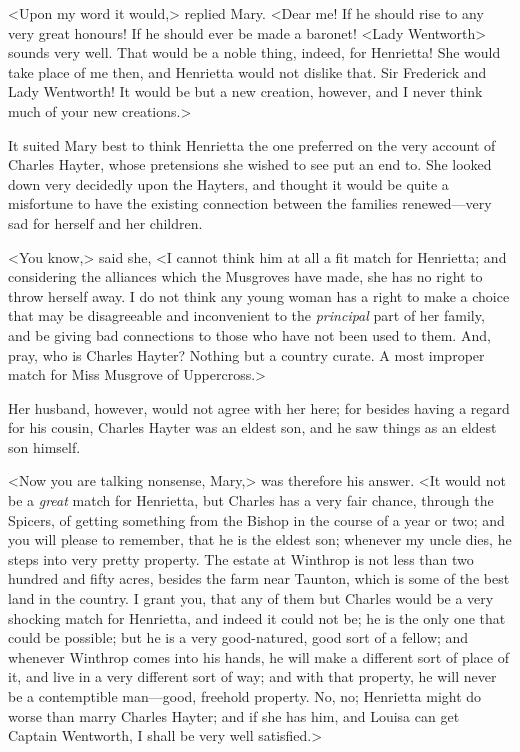 <Upon my word it would,> replied Mary. <Dear me! If he should rise to any very great honours! If he should ever be made a baronet! <Lady Wentworth> sounds very well. That would be a noble thing, indeed, for Henrietta! She would take place of me then, and Henrietta would not dislike that. Sir Frederick and Lady Wentworth! It would be but a new creation, however, and I never think much of your new creations.>

It suited Mary best to think Henrietta the one preferred on the very account of Charles Hayter, whose pretensions she wished to see put an end to. She looked down very decidedly upon the Hayters, and thought it would be quite a misfortune to have the existing connection between the families renewed—very sad for herself and her children.

<You know,> said she, <I cannot think him at all a fit match for Henrietta; and considering the alliances which the Musgroves have made, she has no right to throw herself away. I do not think any young woman has a right to make a choice that may be disagreeable and inconvenient to the \textit{principal} part of her family, and be giving bad connections to those who have not been used to them. And, pray, who is Charles Hayter? Nothing but a country curate. A most improper match for Miss Musgrove of Uppercross.>

Her husband, however, would not agree with her here; for besides having a regard for his cousin, Charles Hayter was an eldest son, and he saw things as an eldest son himself.

<Now you are talking nonsense, Mary,> was therefore his answer. <It would not be a \textit{great} match for Henrietta, but Charles has a very fair chance, through the Spicers, of getting something from the Bishop in the course of a year or two; and you will please to remember, that he is the eldest son; whenever my uncle dies, he steps into very pretty property. The estate at Winthrop is not less than two hundred and fifty acres, besides the farm near Taunton, which is some of the best land in the country. I grant you, that any of them but Charles would be a very shocking match for Henrietta, and indeed it could not be; he is the only one that could be possible; but he is a very good-natured, good sort of a fellow; and whenever Winthrop comes into his hands, he will make a different sort of place of it, and live in a very different sort of way; and with that property, he will never be a contemptible man—good, freehold property. No, no; Henrietta might do worse than marry Charles Hayter; and if she has him, and Louisa can get Captain Wentworth, I shall be very well satisfied.>

